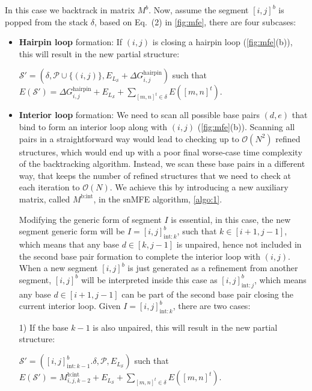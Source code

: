 \documentclass[11pt,letterpaper]{article}  \usepackage[margin=1in]{geometry}
\theoremstyle{definition}  \newtheorem{Definition}[theorem]{Definition}
\newcommand{\snMFE}{snMFE\xspace}
\begin{document}
\begin{enumerate}
	In this case we backtrack in matrix $M^b$. 	
	Now, assume the segment $[i,j]^b$ is popped from the stack $\delta$, based on Eq.~(2) in \cref{fig:mfe}, there are four subcases:
	
	\begin{itemize}
		
		\item \textbf{Hairpin loop} formation: If  $(i,j)$ is closing a hairpin loop (\cref{fig:mfe}(b)), this will result in the new partial structure:
		
		$\mathcal{S}' = (\delta, \mathcal{P} \cup \{(i,j)\}, E_{L_{\mathcal{S}}} + \Delta G_{i,j}^\text{hairpin} )$ such that $E(\mathcal{S}') = \Delta G_{i,j}^\text{hairpin} + E_{L_{\mathcal{S}}} 
		+ \sum \limits_{[m,n]^t \in \delta} E([m,n]^t)$. 
		
		
		\item \textbf{Interior loop} formation: We need to scan all possible base pairs $(d,e)$ that bind to form an interior loop along with $(i,j)$ (\cref{fig:mfe}(b)). 
		Scanning all pairs in a straightforward way would lead to checking up to $\mathcal{O}(N^2)$ refined structures, 
		which would end up with a poor final worse-case time complexity of the backtracking algorithm. 
		Instead, we scan these base pairs in a different way, that keeps the number of refined structures that we need to check at each iteration to $\mathcal{O}(N)$. We achieve this by introducing a new auxiliary matrix, called $M^\text{b:int}$, in the \snMFE algorithm,  \cref{algo:1}. 		
		
		Modifying the generic form of segment $I$ is essential, in this case, the new segment generic form will be $I = [i,j]^b_{\text{int}:k}$, such that $k \in [i+1,j-1]$, which means that any base $d \in[k,j-1]$ is unpaired, hence not included in the second base pair formation to complete the interior loop with $(i,j)$.
		When a new segment $[i,j]^b$ is just generated as a refinement from another segment, 
		$[i,j]^b$ will be interpreted inside this case as $ [i,j]^b_{\text{int}:j} $, which means any base $d \in [i+1,j-1]$ can be part of the second base pair closing the current interior loop. 
		Given  $I = [i,j]^b_{\text{int}:k}$, there are two cases:
		
		1) If the base $k-1$ is also unpaired, this will
		result in the new partial structure: 
		
		$\mathcal{S}' = ([i,j]^b_{\text{int}:k-1}.\delta, \mathcal{P}, E_{L_{\mathcal{S}}})$ such that $E(\mathcal{S}') = M_{i,j,k-2}^\text{b:int} + E_{L_{\mathcal{S}}} 
		+ \sum \limits_{[m,n]^t \in \delta} E([m,n]^t)$.
		

\end{itemize}
\end{enumerate}
\end{document}
